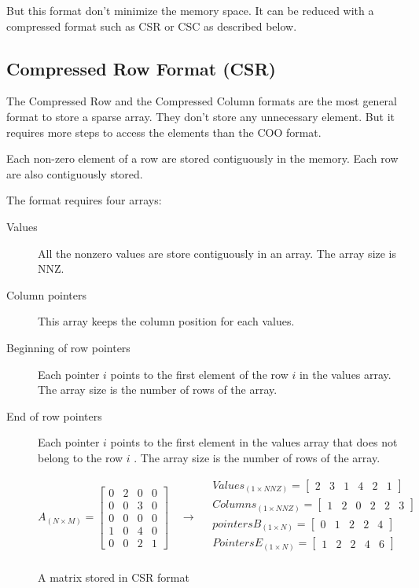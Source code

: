 But this format don't minimize the memory space. It can be reduced with a compressed format such as CSR or CSC as described below.

\subsection{Compressed Row Format (CSR)}
The Compressed Row and the Compressed Column formats are the most general format to store a sparse array. They don't store any unnecessary element. But it requires more steps to access the elements than the COO format. 

Each non-zero element of a row are stored contiguously in the memory. Each row are also contiguously stored.

The format requires four arrays:
\begin{description}
	\item [Values] All the nonzero values are store contiguously in an array. The array size is {NNZ}.
	\item [Column pointers] This array keeps the column position for each values.
	\item [Beginning of row pointers] Each pointer $i$ points to the first element of the row $i$ in the values array. The array size is the number of rows of the array.
	\item [End of row pointers]  Each pointer $i$ points to the first element in the values array that does not belong to the row $i$ . The array size is the number of rows of the array.
\end{description}

\begin{figure}
\[
A_{(N\times M)} = 
\begin{bmatrix}
0 & 2 & 0 & 0\\
0 & 0 & 3 & 0\\
0 & 0 & 0 & 0\\
1 & 0 & 4 & 0\\
0 & 0 & 2 & 1
\end{bmatrix}
\quad\rightarrow\quad
\begin{aligned}
Values_{(1\times NNZ)} = 
\begin{bmatrix}
2 &  3 & 1 & 4 & 2 & 1
\end{bmatrix}
\\
Columns_{(1\times NNZ)} = 
\begin{bmatrix}
1 &  2 & 0 & 2 & 2 & 3
\end{bmatrix}
\\
pointersB_{(1\times N)} = 
\begin{bmatrix}
0 & 1 & 2 & 2 & 4 
\end{bmatrix}
\\
PointersE_{(1\times N)} = 
\begin{bmatrix}
1 & 2 & 2 & 4 & 6
\end{bmatrix}
\\
\end{aligned}
\]
\caption{A matrix stored in CSR format}
\end{figure}
